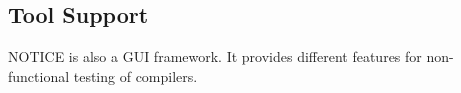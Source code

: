 		

		
		
\subsection{Tool Support}		
NOTICE is also a GUI framework. It provides different features for non-functional testing of compilers.

